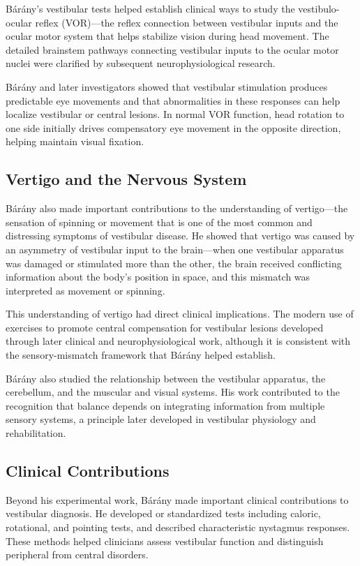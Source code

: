 B\'ar\'any's vestibular tests helped establish clinical ways to study the vestibulo-ocular reflex (VOR)---the reflex connection between vestibular inputs and the ocular motor system that helps stabilize vision during head movement. The detailed brainstem pathways connecting vestibular inputs to the ocular motor nuclei were clarified by subsequent neurophysiological research.

B\'ar\'any and later investigators showed that vestibular stimulation produces predictable eye movements and that abnormalities in these responses can help localize vestibular or central lesions. In normal VOR function, head rotation to one side initially drives compensatory eye movement in the opposite direction, helping maintain visual fixation.

\subsection{Vertigo and the Nervous System}

B\'ar\'any also made important contributions to the understanding of vertigo---the sensation of spinning or movement that is one of the most common and distressing symptoms of vestibular disease. He showed that vertigo was caused by an asymmetry of vestibular input to the brain---when one vestibular apparatus was damaged or stimulated more than the other, the brain received conflicting information about the body's position in space, and this mismatch was interpreted as movement or spinning.

This understanding of vertigo had direct clinical implications. The modern use of exercises to promote central compensation for vestibular lesions developed through later clinical and neurophysiological work, although it is consistent with the sensory-mismatch framework that B\'ar\'any helped establish.

B\'ar\'any also studied the relationship between the vestibular apparatus, the cerebellum, and the muscular and visual systems. His work contributed to the recognition that balance depends on integrating information from multiple sensory systems, a principle later developed in vestibular physiology and rehabilitation.

\subsection{Clinical Contributions}

Beyond his experimental work, B\'ar\'any made important clinical contributions to vestibular diagnosis. He developed or standardized tests including caloric, rotational, and pointing tests, and described characteristic nystagmus responses. These methods helped clinicians assess vestibular function and distinguish peripheral from central disorders.\cite{barany-history}


